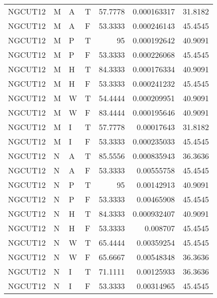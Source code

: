 \begin{tabular}{llllrrr}
    NGCUT12  & M     & A     & T          & 57.7778    & 0.000163317 & 31.8182  \\
    NGCUT12  & M     & A     & F          & 53.3333    & 0.000246143 & 45.4545  \\
    NGCUT12  & M     & P     & T          & 95         & 0.000192642 & 40.9091  \\
    NGCUT12  & M     & P     & F          & 53.3333    & 0.000226068 & 45.4545  \\
    NGCUT12  & M     & H     & T          & 84.3333    & 0.000176334 & 40.9091  \\
    NGCUT12  & M     & H     & F          & 53.3333    & 0.000241232 & 45.4545  \\
    NGCUT12  & M     & W     & T          & 54.4444    & 0.000209951 & 40.9091  \\
    NGCUT12  & M     & W     & F          & 83.4444    & 0.000195646 & 40.9091  \\
    NGCUT12  & M     & I     & T          & 57.7778    & 0.00017643  & 31.8182  \\
    NGCUT12  & M     & I     & F          & 53.3333    & 0.000235033 & 45.4545  \\
    NGCUT12  & N     & A     & T          & 85.5556    & 0.000835943 & 36.3636  \\
    NGCUT12  & N     & A     & F          & 53.3333    & 0.00555758  & 45.4545  \\
    NGCUT12  & N     & P     & T          & 95         & 0.00142913  & 40.9091  \\
    NGCUT12  & N     & P     & F          & 53.3333    & 0.00465908  & 45.4545  \\
    NGCUT12  & N     & H     & T          & 84.3333    & 0.000932407 & 40.9091  \\
    NGCUT12  & N     & H     & F          & 53.3333    & 0.008707    & 45.4545  \\
    NGCUT12  & N     & W     & T          & 65.4444    & 0.00359254  & 45.4545  \\
    NGCUT12  & N     & W     & F          & 65.6667    & 0.00548348  & 36.3636  \\
    NGCUT12  & N     & I     & T          & 71.1111    & 0.00125933  & 36.3636  \\
    NGCUT12  & N     & I     & F          & 53.3333    & 0.00314965  & 45.4545  \\
    \hline
\end{tabular}